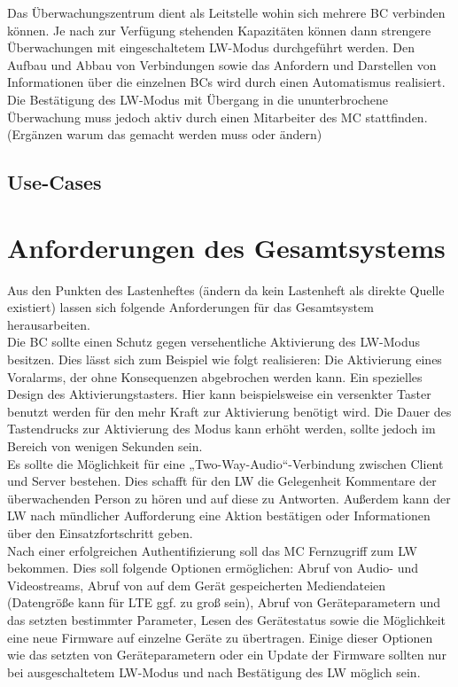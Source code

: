 \documentclass[thesis.tex]{subfiles}
\begin{document}
Das Überwachungszentrum dient als Leitstelle wohin sich mehrere BC verbinden können.
Je nach zur Verfügung stehenden Kapazitäten können dann strengere Überwachungen mit eingeschaltetem LW-Modus durchgeführt werden.
Den Aufbau und Abbau von Verbindungen sowie das Anfordern und Darstellen von Informationen über die einzelnen BCs wird
durch einen Automatismus realisiert.
Die Bestätigung des LW-Modus mit Übergang in die ununterbrochene Überwachung muss jedoch aktiv durch einen Mitarbeiter des MC stattfinden. (Ergänzen warum das gemacht werden muss oder ändern)
\\

\subsection{Use-Cases}
\section{Anforderungen des Gesamtsystems}
Aus den Punkten des Lastenheftes (ändern da kein Lastenheft als direkte Quelle existiert) lassen sich folgende Anforderungen für das Gesamtsystem herausarbeiten.
\\

Die BC sollte einen Schutz gegen versehentliche Aktivierung des LW-Modus besitzen.
Dies lässt sich zum Beispiel wie folgt realisieren: Die Aktivierung eines Voralarms, der ohne Konsequenzen abgebrochen werden kann.
Ein spezielles Design des Aktivierungstasters. Hier kann beispielsweise ein versenkter Taster benutzt werden für den mehr Kraft zur
Aktivierung benötigt wird.
Die Dauer des Tastendrucks zur Aktivierung des Modus kann erhöht werden, sollte jedoch im Bereich von wenigen Sekunden sein.
\\

Es sollte die Möglichkeit für eine „Two-Way-Audio“-Verbindung zwischen Client und Server bestehen.
Dies schafft für den LW die Gelegenheit Kommentare der überwachenden Person zu hören und auf diese zu Antworten.
Außerdem kann der LW nach mündlicher Aufforderung eine Aktion bestätigen oder Informationen über den Einsatzfortschritt geben.
\\

Nach einer erfolgreichen Authentifizierung soll das MC Fernzugriff zum LW bekommen.
Dies soll folgende Optionen ermöglichen: Abruf von Audio- und Videostreams, Abruf von auf dem Gerät gespeicherten Mediendateien
(Datengröße kann für LTE ggf. zu groß sein), Abruf von Geräteparametern und das setzten bestimmter Parameter, Lesen des Gerätestatus
sowie die Möglichkeit eine neue Firmware auf einzelne Geräte zu übertragen.
Einige dieser Optionen wie das setzten von Geräteparametern oder ein Update der Firmware sollten nur bei ausgeschaltetem LW-Modus
und nach Bestätigung des LW möglich sein.
\\
\end{document}

